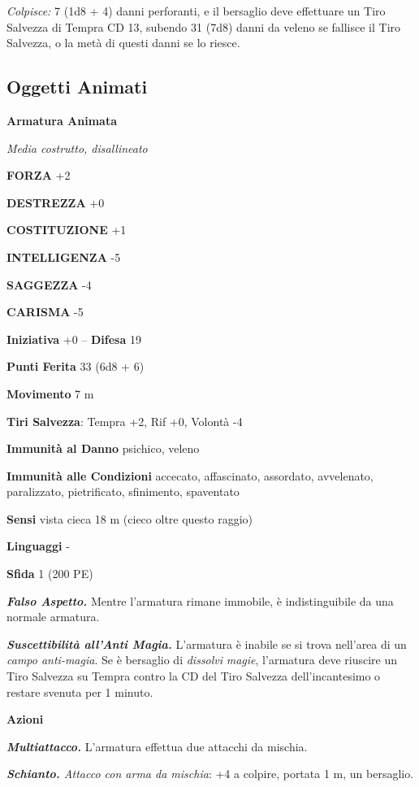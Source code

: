 \begin{multicols}{2}
\emph{Colpisce:} 7 (1d8 + 4) danni perforanti, e il bersaglio deve effettuare un Tiro Salvezza di Tempra CD 13, subendo 31 (7d8) danni da veleno se fallisce il Tiro Salvezza, o la metà di questi danni se lo riesce.

\subsection{Oggetti Animati}

\medskip{}\textbf{Armatura Animata}

\emph{Media costrutto, disallineato}

\textbf{FORZA} +2

\textbf{DESTREZZA} +0

\textbf{COSTITUZIONE} +1

\textbf{INTELLIGENZA} -5

\textbf{SAGGEZZA} -4

\textbf{CARISMA} -5

\textbf{Iniziativa} +0 -- \textbf{Difesa} 19

\textbf{Punti Ferita} 33 (6d8 + 6)

\textbf{Movimento} 7 m

\textbf{Tiri Salvezza}: Tempra +2, Rif +0, Volontà -4

\textbf{Immunità al Danno} psichico, veleno

\textbf{Immunità alle Condizioni} accecato, affascinato, assordato, avvelenato, paralizzato, pietrificato, sfinimento, spaventato

\textbf{Sensi} vista cieca 18 m (cieco oltre questo raggio)

\textbf{Linguaggi} -

\textbf{Sfida} 1 (200 PE)

\emph{\textbf{Falso Aspetto.}} Mentre l'armatura rimane immobile, è indistinguibile da una normale armatura.

\emph{\textbf{Suscettibilità all'Anti Magia.}} L'armatura è inabile se si trova nell'area di un \emph{campo anti-magia}. Se è bersaglio di \emph{dissolvi} \emph{magie}, l'armatura deve riuscire un Tiro Salvezza su Tempra contro la CD del Tiro Salvezza dell'incantesimo o restare svenuta per 1 minuto.

\textbf{Azioni}

\emph{\textbf{Multiattacco.}} L'armatura effettua due attacchi da mischia.

\emph{\textbf{Schianto.} Attacco con arma da mischia}: +4 a colpire, portata 1 m, un bersaglio.


\end{multicols}
